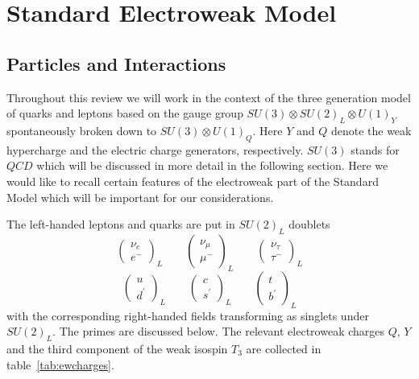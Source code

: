 \section{Standard Electroweak Model}
         \label{sec:sewm}
\subsection{Particles and Interactions}
            \label{sec:sewm:particles}
Throughout this review we will work in the context of the three
generation model of quarks and leptons based on the gauge group
$SU(3)\otimes SU(2)_L\otimes U(1)_Y $ spontaneously broken down
 to $SU(3)\otimes U(1)_Q$.
Here $Y$ and $Q$ denote the weak hypercharge and the electric charge
generators, respectively. $SU(3)$ stands for $QCD$ which will be discussed
in more detail in the following section. Here we would like to recall certain
features of the electroweak part of the Standard Model which will be
important for our considerations.

The left-handed leptons and quarks are put in $ SU(2)_L $ doublets
\begin{equation}\label{2.31}
\left(\begin{array}{c}
\nu_e \\
e^-
\end{array}\right)_L\qquad
\left(\begin{array}{c}
\nu_\mu \\
\mu^-
\end{array}\right)_L\qquad
\left(\begin{array}{c}
\nu_\tau \\
\tau^-
\end{array}\right)_L
\end{equation}
\begin{equation}\label{2.66}
\left(\begin{array}{c}
u \\
d^\prime
\end{array}\right)_L\qquad
\left(\begin{array}{c}
c \\
s^\prime
\end{array}\right)_L\qquad
\left(\begin{array}{c}
t \\
b^\prime
\end{array}\right)_L       
\end{equation}
with the corresponding right-handed fields transforming as singlets
under $ SU(2)_L $. The primes are discussed below.
The relevant electroweak charges $Q$, $Y$ and the third component of
the weak isospin $T_3$ are collected in table~\ref{tab:ewcharges}.

